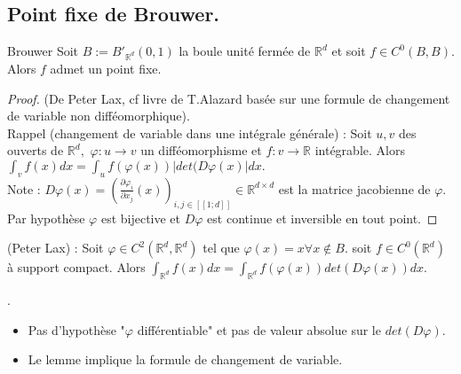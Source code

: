 \subsection{Point fixe de Brouwer.}
\begin{theoreme}{Brouwer}
	\label{brouwer}
    Soit $B:=B'_{\mathbb{R} ^d}(0,1)$ la boule unité fermée de $\mathbb{R} ^d$ et soit $f\in C^0(B,B).$ Alors $f$ admet un point fixe.
\end{theoreme}
\begin{proof}
    (De Peter Lax, cf livre de T.Alazard basée sur une formule de changement de variable non difféomorphique).\\
    Rappel (changement de variable dans une intégrale générale) : Soit $u,v$ des ouverts de $\mathbb{R} ^d,$ $\varphi :u\to v$ un difféomorphisme et $f:v\to \mathbb{R} $ intégrable. Alors $\int_vf(x)dx=\int_uf(\varphi (x))|det(D\varphi (x)|dx. $\\
    Note : $D\varphi (x)=\left( \frac{\partial \varphi _i}{\partial x_j}(x) \right)_{i,j\in [\![1;d]\!]}\in \mathbb{R} ^{d\times d} $ est la matrice jacobienne de $\varphi .$ \\
    Par hypothèse $\varphi $ est bijective et $D\varphi $ est continue et inversible en tout point.
\end{proof}
    \begin{lemme}
        (Peter Lax) : Soit $\varphi \in C^2(\mathbb{R} ^d,\mathbb{R} ^d)$ tel que $\varphi (x)=x\forall x\not\in B.$ soit $f\in C^0(\mathbb{R} ^d)$ à support compact. Alors $\int_{\mathbb{R} ^d}f(x)dx=\int_{\mathbb{R} ^d}f(\varphi (x))det(D\varphi (x))dx.$
    \end{lemme}
    \begin{remarque}
        .
        \begin{itemize}
            \item Pas d'hypothèse "$\varphi$ différentiable" et pas de valeur absolue sur le $det(D\varphi )$.
            \item Le lemme implique la formule de changement de variable.
        \end{itemize}
    \end{remarque}
